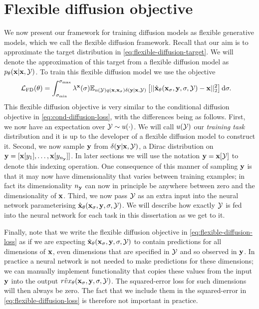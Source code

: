 \section{Flexible diffusion objective}

We now present our framework for training diffusion models as flexible generative models, which we call the flexible diffusion framework. Recall that our aim is to approximate the target distribution in \cref{eq:flexible-diffusion-target}. We will denote the approximation of this target from a flexible diffusion model as $p_\theta({\mathbf{x}}|{\mathbf{x}},{\mathcal{Y}})$. To train this flexible diffusion model we use the objective
\begin{align} \label{eq:flexible-diffusion-loss}
    \mathcal{L}_\text{FD}(\theta) &= \int_{\sigma_\text{min}}^{\sigma_\text{max}} \lambda^{\mathbf{x}}(\sigma) \mathbb{E}_{u({\mathcal{Y}})q({\mathbf{x}}, {\mathbf{x}}_\sigma)\delta({\mathbf{y}}|{\mathbf{x}},{\mathcal{Y}})} \left[ 
    || \hat{{\mathbf{x}}}_\theta({\mathbf{x}}_\sigma, {\mathbf{y}}, \sigma, {\mathcal{Y}}) - {\mathbf{x}} ||_2^2 \right] \mathrm{d}\sigma.
\end{align}
This flexible diffusion objective is very similar to the conditional diffusion objective in \cref{eq:cond-diffusion-loss}, with the differences being as follows. First, we now have an expectation over ${\mathcal{Y}} \sim u(\cdot)$. We will call $u({\mathcal{Y}})$ our \textit{training task} distribution and it is up to the developer of a flexible diffusion model to construct it. Second, we now sample ${\mathbf{y}}$ from $\delta({\mathbf{y}}|{\mathbf{x}},{\mathcal{Y}})$, a Dirac distribution on ${\mathbf{y}} = [ {\mathbf{x}}[y_1], \ldots, {\mathbf{x}}[y_{n_{\mathbf{y}}}] ]$. In later sections we will use the notation ${\mathbf{y}} = {\mathbf{x}}[{\mathcal{Y}}]$ to denote this indexing operation. One consequence of this manner of sampling ${\mathbf{y}}$ is that it may now have dimensionality that varies between training examples; in fact its dimensionality $n_{\mathbf{y}}$ can now in principle be anywhere between zero and the dimensionality of ${\mathbf{x}}$. Third, we now pass ${\mathcal{Y}}$ as an extra input into the neural network parameterising $\hat{{\mathbf{x}}}_\theta({\mathbf{x}}_\sigma, {\mathbf{y}}, \sigma, {\mathcal{Y}})$. We will describe how exactly ${\mathcal{Y}}$ is fed into the neural network for each task in this dissertation as we get to it.

Finally, note that we write the flexible diffusion objective in  \cref{eq:flexible-diffusion-loss} as if we are expecting $\hat{{\mathbf{x}}}_\theta({\mathbf{x}}_\sigma, {\mathbf{y}}, \sigma, {\mathcal{Y}})$ to contain predictions for all dimensions of ${\mathbf{x}}$, even dimensions that are specified in ${\mathcal{Y}}$ and so observed in ${\mathbf{y}}$. In practice a neural network is not needed to make predictions for these dimensions; we can manually implement functionality that copies these values from the input ${\mathbf{y}}$ into the output $\hat{rvx}_\theta({\mathbf{x}}_\sigma, {\mathbf{y}}, \sigma, {\mathcal{Y}})$. The squared-error loss for such dimensions will then always be zero. The fact that we include them in the squared-error in \cref{eq:flexible-diffusion-loss} is therefore not important in practice.

